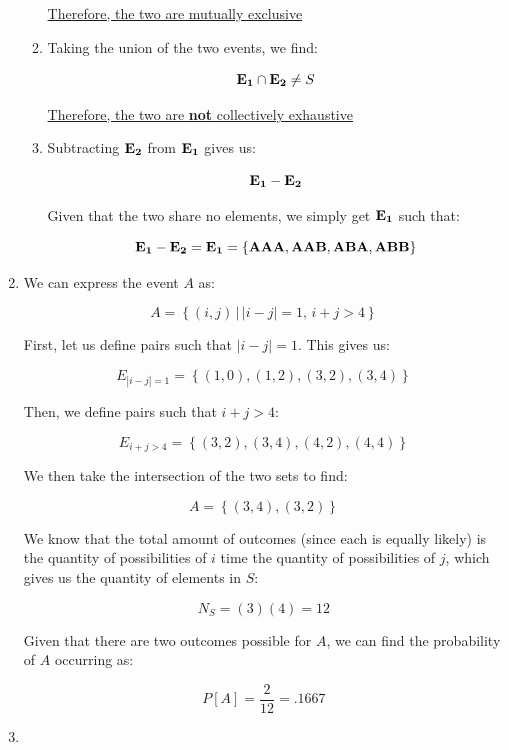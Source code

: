 \begin{enumerate}
\begin{enumerate}
        \underline{Therefore, the two are mutually exclusive}

      \item Taking the union of the two events, we find:

        $$\bold{E_1}\cap\bold{E_2}\neq S$$

        \underline{Therefore, the two are \textbf{not} collectively exhaustive}

      \item Subtracting $\bold{E_2}$ from $\bold{E_1}$ gives us:

        $$\bold{E_1}-\bold{E_2}$$

        Given that the two share no elements, we simply get $\bold{E_1}$ such that:

        $$\bold{E_1}-\bold{E_2}=\bold{E_1}=\left\{ \text{\textbf{AAA}},\text{\textbf{AAB}},\text{\textbf{ABA}},\text{\textbf{ABB}} \right\}$$

    \end{enumerate}

    \setcounter{enumi}{3}

  \item We can express the event $A$ as:

    $$A=\left\{ (i,j)\,\Big|\,|i-j|=1,\, i+j>4 \right\}$$

    First, let us define pairs such that $|i-j|=1$. This gives us:

    $$E_{|i-j|=1}=\left\{(1,0),(1,2),(3,2),(3,4)  \right\}$$

    Then, we define pairs such that $i+j>4$:

    $$E_{i+j>4}=\left\{(3,2),(3,4),(4,2),(4,4)  \right\}$$

    We then take the intersection of the two sets to find:

    $$\boxed{A=\left\{ (3,4),(3,2) \right\}}$$

    We know that the total amount of outcomes (since each is equally likely) is the quantity of possibilities of $i$ time the quantity of possibilities of $j$, which gives us the quantity of elements in $S$:

    $$N_S=(3)(4)=12$$

    Given that there are two outcomes possible for $A$, we can find the probability of $A$ occurring as:

    $$\boxed{P[A]=\frac{2}{12}=.1667}$$

  \item 

    \begin{enumerate}


\end{enumerate}
\end{enumerate}
